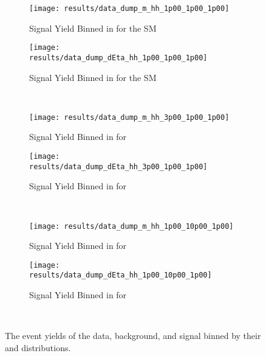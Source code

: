     \begin{figure}
        \centering
        \begin{subfigure}{0.48\textwidth} 
            \texttt{[image: results/data\_dump\_m\_hh\_1p00\_1p00\_1p00]}
            \caption{Signal Yield Binned in \mhh for the SM}
            \label{fig:data_dump_m_hh_1p00_1p00_1p00}
        \end{subfigure}
        \begin{subfigure}{0.48\textwidth}
            \texttt{[image: results/data\_dump\_dEta\_hh\_1p00\_1p00\_1p00]}
            \caption{Signal Yield Binned in \deta for the SM}
            \label{fig:data_dump_dEta_hh_1p00_1p00_1p00}
        \end{subfigure}\\
        \begin{subfigure}{0.48\textwidth} 
            \texttt{[image: results/data\_dump\_m\_hh\_3p00\_1p00\_1p00]}
            \caption{Signal Yield Binned in \mhh for }
            \label{fig:data_dump_m_hh_3p00_1p00_1p00}
        \end{subfigure}
        \begin{subfigure}{0.48\textwidth}
            \texttt{[image: results/data\_dump\_dEta\_hh\_3p00\_1p00\_1p00]}
            \caption{Signal Yield Binned in \deta for }
            \label{fig:data_dump_dEta_hh_3p00_1p00_1p00}
        \end{subfigure}\\
        \begin{subfigure}{0.48\textwidth} 
            \texttt{[image: results/data\_dump\_m\_hh\_1p00\_10p00\_1p00]}
            \caption{Signal Yield Binned in \mhh for }
            \label{fig:data_dump_m_hh_1p00_10p00_1p00}
        \end{subfigure}
        \begin{subfigure}{0.48\textwidth}
            \texttt{[image: results/data\_dump\_dEta\_hh\_1p00\_10p00\_1p00]}
            \caption{Signal Yield Binned in \deta for }
            \label{fig:data_dump_dEta_hh_1p00_10p00_1p00}
        \end{subfigure}\\
        \caption{
            \small
            The event yields of the data, background, and signal binned by their \mhh and \deta distributions.
}
\end{figure}
